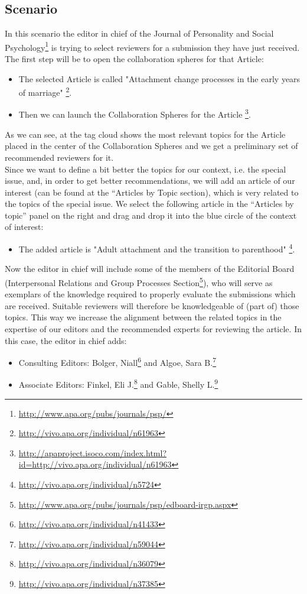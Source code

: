 \subsection{Scenario}
In this scenario the editor in chief of the Journal of Personality and Social
Psychology\footnote{\url{http://www.apa.org/pubs/journals/psp/}} is trying to
select reviewers for a submission they have just received. The first step will
be to open the collaboration spheres for that Article: 
\begin{itemize}
  \item The selected Article is called "Attachment change processes in the early
years of marriage" \footnote{\url{http://vivo.apa.org/individual/n61963}}.
  \item Then we can launch the Collaboration Spheres for the Article
\footnote{\url{http://apaproject.isoco.com/index.html?id=http://vivo.apa.org/individual/n61963}}.
\end{itemize}
As we can see, at the tag cloud shows the most relevant topics for the Article
placed in the center of the Collaboration Spheres and we get a preliminary set
of recommended reviewers for it.\\
Since we want to define a bit better the topics for our context, i.e. the
special issue, and, in order to get better recommendations, we will add an
article of our interest (can be found at the “Articles by Topic section), which
is very related to the topics of the special issue. We select the following
article in the “Articles by topic” panel on the right and drag and drop it into
the blue circle of the context of interest:
\begin{itemize}
  \item The added article is "Adult attachment and the transition to parenthood"
\footnote{\url{http://vivo.apa.org/individual/n5724}}.
\end{itemize}
Now the editor in chief will include some of the members of the Editorial Board
(Interpersonal Relations and Group Processes
Section\footnote{\url{http://www.apa.org/pubs/journals/psp/edboard-irgp.aspx}}),
who will serve as exemplars of the knowledge required to properly evaluate the
submissions which are received. Suitable reviewers will therefore be
knowledgeable of (part of) those topics. This way we increase the alignment
between the related topics in the expertise of our editors and the recommended
experts for reviewing the article. In this case, the editor in chief adds:
\begin{itemize}
  \item Consulting Editors: Bolger, Niall\footnote{\url{http://vivo.apa.org/individual/n41433}} and Algoe, Sara B.\footnote{\url{http://vivo.apa.org/individual/n59044}}
  \item Associate Editors: Finkel, Eli J.\footnote{\url{http://vivo.apa.org/individual/n36079}} and Gable, Shelly L.\footnote{\url{http://vivo.apa.org/individual/n37385}} 
\end{itemize}
